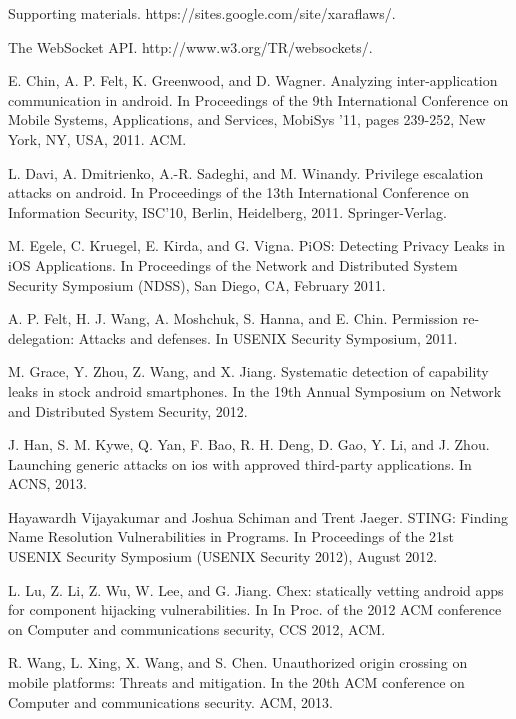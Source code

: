 \documentclass{article}
\begin{document}
\begin{thebibliography}{100}
Supporting materials.
https://sites.google.com/site/xaraflaws/.

The WebSocket API.
http://www.w3.org/TR/websockets/.

E. Chin, A. P. Felt, K. Greenwood, and D. Wagner.
Analyzing inter-application communication in android.
In Proceedings of the 9th International Conference on
Mobile Systems, Applications, and Services, MobiSys
'11, pages 239-252, New York, NY, USA, 2011. ACM.

L. Davi, A. Dmitrienko, A.-R. Sadeghi, and
M. Winandy. Privilege escalation attacks on android.
In Proceedings of the 13th International Conference on
Information Security, ISC'10, Berlin, Heidelberg,
2011. Springer-Verlag.

M. Egele, C. Kruegel, E. Kirda, and G. Vigna. PiOS:
Detecting Privacy Leaks in iOS Applications. In
Proceedings of the Network and Distributed System
Security Symposium (NDSS), San Diego, CA, February 2011.

A. P. Felt, H. J. Wang, A. Moshchuk, S. Hanna, and
E. Chin. Permission re-delegation: Attacks and
defenses. In USENIX Security Symposium, 2011.

M. Grace, Y. Zhou, Z. Wang, and X. Jiang.
Systematic detection of capability leaks in stock
android smartphones. In the 19th Annual Symposium
on Network and Distributed System Security, 2012.

J. Han, S. M. Kywe, Q. Yan, F. Bao, R. H. Deng,
D. Gao, Y. Li, and J. Zhou. Launching generic attacks
on ios with approved third-party applications. In
ACNS, 2013.

Hayawardh Vijayakumar and Joshua Schiman and
Trent Jaeger. STING: Finding Name Resolution
Vulnerabilities in Programs. In Proceedings of the 21st
USENIX Security Symposium (USENIX Security
2012), August 2012.

L. Lu, Z. Li, Z. Wu, W. Lee, and G. Jiang. Chex:
statically vetting android apps for component
hijacking vulnerabilities. In In Proc. of the 2012 ACM
conference on Computer and communications security,
CCS 2012, ACM.

R. Wang, L. Xing, X. Wang, and S. Chen.
Unauthorized origin crossing on mobile platforms:
Threats and mitigation. In the 20th ACM conference
on Computer and communications security. ACM,
2013.


\end{thebibliography}
\end{document}
